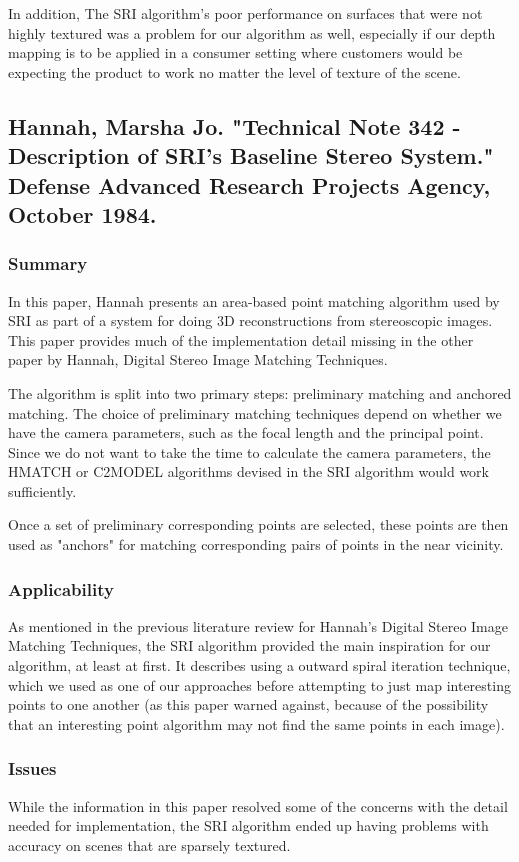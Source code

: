 In addition, The SRI algorithm's poor performance on surfaces that were not highly textured was a problem for our algorithm as well, especially if our depth mapping is to be applied in a consumer setting where customers would be expecting the product to work no matter the level of texture of the scene. 


\subsection{Hannah, Marsha Jo. "Technical Note 342 - Description of SRI's Baseline Stereo System." Defense Advanced Research Projects Agency, October 1984. }

\subsubsection{Summary}
In this paper, Hannah presents an area-based point matching algorithm used by SRI as part of a system for doing 3D reconstructions from stereoscopic images. This paper provides much of the implementation detail missing in the other paper by Hannah, Digital Stereo Image Matching Techniques. 

The algorithm is split into two primary steps: preliminary matching and anchored matching. The choice of preliminary matching techniques depend on whether we have the camera parameters, such as the focal length and the principal point. Since we do not want to take the time to calculate the camera parameters, the HMATCH or C2MODEL algorithms devised in the SRI algorithm would work sufficiently. 

Once a set of preliminary corresponding points are selected, these points are then used as "anchors" for matching corresponding pairs of points in the near vicinity.  

\subsubsection{Applicability}
As mentioned in the previous literature review for Hannah's Digital Stereo Image Matching Techniques, the SRI algorithm provided the main inspiration for our algorithm, at least at first.  It describes using a outward spiral iteration technique, which we used as one of our approaches before attempting to just map interesting points to one another (as this paper warned against, because of the possibility that an interesting point algorithm may not find the same points in each image).

\subsubsection{Issues}
While the information in this paper resolved some of the concerns with the detail needed for implementation, the SRI algorithm ended up having problems with accuracy on scenes that are sparsely textured. 

